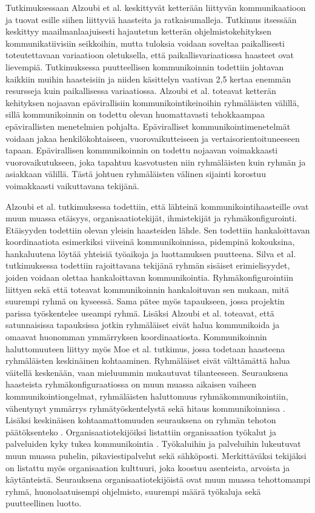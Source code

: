 Tutkimuksessaan Alzoubi et al. \cite{ALZOUBI201622} keskittyvät ketterään liittyvän kommunikaatioon ja tuovat esille siihen liittyviä haasteita ja ratkaisumalleja. Tutkimus itsessään keskittyy maailmanlaajuisesti hajautetun ketterän ohjelmistokehityksen kommunikatiivisiin seikkoihin, mutta tuloksia voidaan soveltaa paikallisesti toteutettavaan variaatioon oletuksella, että paikallisvariaatiossa haasteet ovat lievempiä. Tutkimuksessa puutteellisen kommunikoinnin todettiin johtavan kaikkiin muihin haasteisiin ja niiden käsittelyn vaativan 2,5 kertaa enemmän resursseja kuin paikallisessa variaatiossa. Alzoubi et al. toteavat ketterän kehityksen nojaavan epävirallisiin kommunikointikeinoihin ryhmäläisten välillä, sillä kommunikoinnin on todettu olevan huomattavasti tehokkaampaa epävirallisten menetelmien pohjalta. Epäviralliset kommunikointimenetelmät voidaan jakaa henkilökohtaiseen, vuorovaikutteiseen ja vertaisorientoituneeseen tapaan. Epävirallisen kommunikoinnin on todettu nojaavan voimakkaasti vuorovaikutukseen, joka tapahtuu kasvotusten niin ryhmäläisten kuin ryhmän ja asiakkaan välillä. Tästä johtuen ryhmäläisten välinen sijainti korostuu voimakkaasti vaikuttavana tekijänä.

Alzoubi et al. tutkimuksessa \cite{ALZOUBI201622} todettiin, että lähteinä kommunikointihaasteille ovat muun muassa etäisyys, organisaatiotekijät, ihmistekijät ja ryhmäkonfigurointi. Etäisyyden todettiin olevan yleisin haasteiden lähde. Sen todettiin hankaloittavan koordinaatiota esimerkiksi viiveinä kommunikoinnissa, pidempinä kokouksina, hankaluutena löytää yhteisiä työaikoja ja luottamuksen puutteena. Silva et al. tutkimuksessa \cite{SELLERISILVA201520} todettiin rajoittavana tekijänä ryhmän sisäiset erimielisyydet, joiden voidaan olettaa hankaloittavan kommunikointia. Ryhmäkonfigurointiin liittyen sekä \cite{SELLERISILVA201520} että \cite{ALZOUBI201622} toteavat kommunikoinnin hankaloituvan sen mukaan, mitä suurempi ryhmä on kyseessä. Sama pätee myös tapaukseen, jossa projektin parissa työskentelee useampi ryhmä. Lisäksi Alzoubi et al. \cite{ALZOUBI201622} toteavat, että satunnaisissa tapauksissa jotkin ryhmäläiset eivät halua kommunikoida ja omaavat huonomman ymmärryksen koordinaatiosta. Kommunikoinnin haluttomuuteen liittyy myös Moe et al. \cite{MOE2012853} tutkimus, jossa todetaan haasteena ryhmäläisten keskinäinen kohtaaminen. Ryhmäläiset eivät välttämättä halua väitellä keskenään, vaan mieluummin mukautuvat tilanteeseen. Seurauksena haasteista ryhmäkonfiguraatiossa on muun muassa aikaisen vaiheen kommunikointiongelmat, ryhmäläisten haluttomuus ryhmäkommunikointiin, vähentynyt ymmärrys ryhmätyöskentelystä sekä hitaus kommunikoinnissa \cite{ALZOUBI201622}. Lisäksi keskinäisen kohtaamattomuuden seurauksena on ryhmän tehoton päätöksenteko \cite{MOE2012853}. Organisaatiotekijöiksi listattiin organisaation työkalut ja palveluiden kyky tukea kommunikointia \cite{ALZOUBI201622}. Työkaluihin ja palveluihin lukeutuvat muun muassa puhelin, pikaviestipalvelut sekä sähköposti. Merkittäväksi tekijäksi on listattu myös organisaation kulttuuri, joka koostuu asenteista, arvoista ja käytänteistä. Seurauksena organisaatiotekijöistä ovat muun muassa tehottomampi ryhmä, huonolaatuisempi ohjelmisto, suurempi määrä työkaluja sekä puutteellinen luotto.

